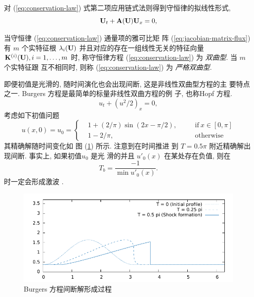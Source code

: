 对 (\ref{eq:conservation-law}) 式第二项应用链式法则得到守恒律的拟线性形式,
\begin{equation}
  \label{eq:quasi-linear-form-conservation-law}
  {\bf{U}}_{t} + {\bf{A}}({\bf{U}}){\bf{U}}_{x} = 0,
\end{equation}
\begin{definition}
  当守恒律 (\ref{eq:conservation-law}) 通量项的雅可比矩
  阵 (\ref{eq:jacobian-matrix-flux}) 有 $m$ 个实特征根
  $\lambda_{i}({\bf{U}})$ 并且对应的存在一组线性无关的特征向量
  ${\bf{K}}^{(i)}({\bf{U}}), i = 1, \ldots, m$ 时, 称守恒律方程
  (\ref{eq:conservation-law}) 为 {\it 双曲型}. 当 $m$ 个实特征跟
  互不相同时, 则称 (\ref{eq:conservation-law}) 为 {\it 严格双曲型}.
\end{definition}
即便初值是光滑的, 随时间演化也会出现间断, 这是非线性双曲型方程的主
要特点之一.  Burgers 方程是最简单的标量非线性双曲方程的例
子, 也称Hopf 方程.
\begin{equation}
  \label{eq:burger-equation}
  u_{t} + {\left( {u^{2}}/{2} \right)}_{x} = 0,
\end{equation}
考虑如下初值问题
\begin{equation}
  \label{eq:burger-equation-initial}
  u(x,0) = u_{0} = \left\{
    \begin{aligned}
      &1 + ({2}/{\pi}) \sin \left( 2x - {\pi}/{2} \right),&
      \quad & \mbox{if}~ x \in [0, \pi]\\
      &1 - {2}/{\pi}, &\quad & \mbox{otherwise}
    \end{aligned}
  \right.
\end{equation}
其精确解随时间变化如
图 (\ref{fig:burgers-shock-formation}) 所示. 注意到在时间推进
到 $T = 0.5 \pi$ 附近精确解出现间断. 事实上, 如果初值$u_{0}$ 是光
滑的并且 $u'_{0}(x)$ 在某处存在负值, 则在
\begin{equation}
  \label{eq:burgers-shock-time}
  T_{b} = \frac{-1}{\min u'_{0}(x)} .
\end{equation}
时一定会形成激波 \cite{LeVeque1992a}.
\begin{figure}[htbp]
  \centering
  \includegraphics[width=1.0\linewidth]{./Pho/Chp2/exact_burgers.pdf}
  \caption{Burgers 方程间断解形成过程}
  \label{fig:burgers-shock-formation}
\end{figure}

